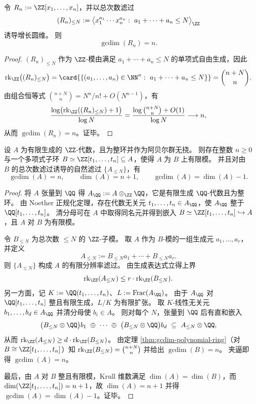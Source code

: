\begin{theorem}[多项式环的增长圆维]\label{thm:gcdim-polynomial-ring}
令 \(R_n:=\ZZ[x_1,\dots,x_n]\)，并以总次数滤过
\[
(R_n)_{\le N}:=\bigl\langle x_1^{a_1}\cdots x_n^{a_n}:\ a_1+\cdots+a_n\le N\bigr\rangle_{\ZZ}
\]
诱导增长圆维。
则
\[
\operatorname{gcdim}(R_n)=n.
\]
\end{theorem}
\begin{proof}
\((R_n)_{\le N}\) 作为 \(\ZZ\)-模由满足 \(a_1+\cdots+a_n\le N\) 的单项式自由生成，因此
\[
\operatorname{rk}_{\ZZ}\bigl((R_n)_{\le N}\bigr)
=\card{\{(a_1,\dots,a_n)\in\NN^{n}:\ a_1+\cdots+a_n\le N\}}
=\binom{n+N}{n}.
\]
由组合恒等式 \(\binom{n+N}{n}=N^{n}/n!+O(N^{n-1})\)，有
\[
\frac{\log\bigl(\operatorname{rk}_{\ZZ}((R_n)_{\le N})+1\bigr)}{\log N}
=\frac{\log\binom{n+N}{n}+O(1)}{\log N}\longrightarrow n,
\]
从而 \(\operatorname{gcdim}(R_n)=n\)。证毕。
\end{proof}

\begin{theorem}\label{thm:gcdim-noether-hilbert-dim-minus-one}
设 \(A\) 为有限生成的 \(\ZZ\)-代数，且为整环并作为阿贝尔群无挠。
则存在整数 \(n\ge 0\) 与一个多项式子环 \(B\simeq \ZZ[t_1,\dots,t_n]\subseteq A\)，使得 \(A\) 为 \(B\) 上有限模。
并且对由 \(B\) 的总次数滤过诱导的自然滤过 \(\{A_{\le N}\}\)，有
\[
\operatorname{gcdim}(A)=n,
\qquad
\dim(A)=n+1,
\qquad
\operatorname{gcdim}(A)=\dim(A)-1.
\]
\end{theorem}
\begin{proof}
将 \(A\) 张量到 \(\QQ\) 得 \(A_{\QQ}:=A\otimes_{\ZZ}\QQ\)，它是有限生成 \(\QQ\)-代数且为整环。
由 Noether 正规化定理，存在代数无关元 \(t_1,\dots,t_n\in A_{\QQ}\)，使 \(A_{\QQ}\) 整于 \(\QQ[t_1,\dots,t_n]\)。
清分母可在 \(A\) 中取得同名元并得到嵌入 \(B\simeq \ZZ[t_1,\dots,t_n]\hookrightarrow A\)，且 \(A\) 对 \(B\) 为有限模。
\par
令 \(B_{\le N}\) 为总次数 \(\le N\) 的 \(\ZZ\)-子模。
取 \(A\) 作为 \(B\)-模的一组生成元 \(a_1,\dots,a_r\)，并定义
\[
A_{\le N}:=B_{\le N}a_1+\cdots+B_{\le N}a_r.
\]
则 \(\{A_{\le N}\}\) 构成 \(A\) 的有限分辨率滤过。
由生成表达式立得上界
\[
\operatorname{rk}_{\ZZ}(A_{\le N})\le r\cdot \operatorname{rk}_{\ZZ}(B_{\le N}).
\]
另一方面，记 \(K:=\QQ(t_1,\dots,t_n)\)、\(L:=\mathrm{Frac}(A_{\QQ})\)。
由于 \(A_{\QQ}\) 对 \(\QQ[t_1,\dots,t_n]\) 整且有限生成，\(L/K\) 为有限扩张。
取 \(K\)-线性无关元 \(b_1,\dots,b_d\in A_{\QQ}\) 并清分母使 \(b_i\in A\)。
则对每个 \(N\)，张量到 \(\QQ\) 后有直和嵌入
\[
\bigl(B_{\le N}\otimes\QQ\bigr)b_1\ \oplus\ \cdots\ \oplus\ \bigl(B_{\le N}\otimes\QQ\bigr)b_d
\ \subseteq\ A_{\le N}\otimes\QQ,
\]
从而
\(
\operatorname{rk}_{\ZZ}(A_{\le N})\ge d\cdot \operatorname{rk}_{\ZZ}(B_{\le N})
\)。
由定理 \ref{thm:gcdim-polynomial-ring}（对 \(B\cong \ZZ[t_1,\dots,t_n]\)）知
\(
\operatorname{rk}_{\ZZ}(B_{\le N})=\binom{n+N}{n}
\)
并给出 \(\operatorname{gcdim}(B)=n\)。
夹逼即得 \(\operatorname{gcdim}(A)=n\)。
\par
最后，由 \(A\) 对 \(B\) 整且有限模，Krull 维数满足 \(\dim(A)=\dim(B)\)，而 \(\dim(\ZZ[t_1,\dots,t_n])=n+1\)，故 \(\dim(A)=n+1\) 并得 \(\operatorname{gcdim}(A)=\dim(A)-1\)。证毕。
\end{proof}

